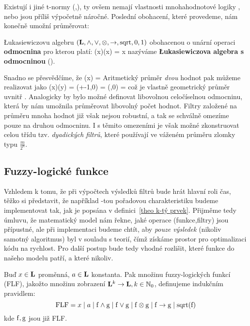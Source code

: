     Existují i jiné t-normy (\cite{MajerovaPhD},\cite{Bělíček}), ty ovšem nemají vlastnosti mnohahodnotové logiky \cite{MajerovaPhD}, nebo jsou příliš výpočetně náročné. Poslední obohacení, které provedeme, nám konečně umožní průměrovat:

    \begin{define}\label{LAsqrt}
    \L ukasiewiczovu algebru $(\mathbf{L},\wedge,\vee,\otimes,\rightarrow,\mathrm{sqrt},0,1)$ obohacenou o unární operaci \textbf{odmocnina} pro kterou platí:
    \beq
    \sqr(x)\otimes\sqr(x) = x
    \eeq
    nazýváme \textbf{\L ukasiewiczova algebra s odmocninou} \textup{(\LAsq)}.
    \end{define}

    Snadno se přesvědčíme, že
    \beq
    \sqr(x) = 
    \eeq
    Aritmetický průměr \emph{dvou} hodnot pak můžeme realizovat jako
    \beq
    \sqr(x)\otimes \sqr(y) = \max\left(+-1,0\right) = \max\left(,0\right) = 
    \eeq
    což je vlastně geometrický průměr uvnitř \LAsq. Analogicky by bylo možné definovat libovolnou celočíselnou odmocninu, která by nám umožnila průměrovat libovolný počet hodnot. Filtry založené na průměru mnoha hodnot již však nejsou robustní, a tak se schválně omezíme pouze na druhou odmocninu. I s těmito omezeními je však možné zkonstruovat celou třídu tzv. \emph{dyadických filtrů}, které používají ve váženém průměru zlomky typu $\frac{m}{2^n}$.

    \subsection{Fuzzy-logické funkce}

    Vzhledem k tomu, že při výpočtech výsledků filtrů bude hrát hlavní roli čas, těžko si představit, že například \kk-tou pořadovou charakteristiku budeme implementovat tak, jak je popsána v definici~\ref{theo k-tý prvek}. Přijměme tedy úmluvu, že matematický model nám řekne, jaké operace (funkce,filtry) jsou přípustné, ale při implementaci budeme chtít, aby \emph{pouze výsledek} (nikoliv samotný algoritmus) byl v souladu s teorií, čímž získáme prostor pro optimalizaci kódu na rychlost. Pro další postup bude tedy vhodné rozlišit, které funkce do našeho modelu patří, a které nikoliv.

    \begin{define}\label{def FLF}
    Buď $x \in \mathbf{L}$ proměnná, $a \in \mathbf{L}$ konstanta. Pak množinu fuzzy-logických funkcí \textup{(FLF)}, jakožto množinu zobrazení $\mathbf{L}^k \rightarrow \mathbf{L}, k \in \mathbb{N}_0$, definujeme indukčním pravidlem:
    \[
    \mathrm{FLF} = x \mid a \mid \mathrm{f} \wedge \mathrm{g} \mid \mathrm{f} \vee \mathrm{g} \mid \mathrm{f} \otimes \mathrm{g} \mid \mathrm{f} \rightarrow \mathrm{g} \mid \mathrm{sqrt}(\mathrm{f})
    \]
    kde $\mathrm{f},\mathrm{g}$ jsou již \textup{FLF}.
    \end{define}

